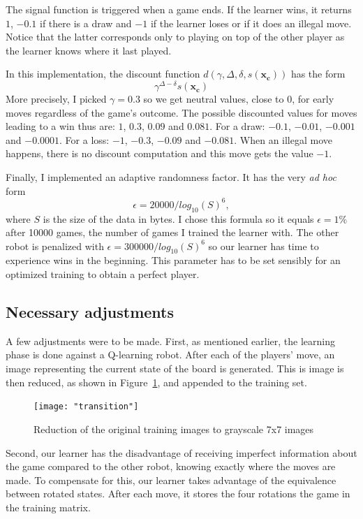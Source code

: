 \documentclass[scrartcl, 10.5 pt, conference]{ieeeconf}
\newcommand{\B}[1]{\mathbf{#1}}
\begin{document}
The signal function is triggered when a game ends. If the learner wins, it returns $1$, $-0.1$ if there is a draw and $-1$ if the learner loses or if it does an illegal move. Notice that the latter corresponds only to playing on top of the other player as the learner knows where it last played.

In this implementation, the discount function $d(\gamma, \Delta, \delta, s(\B{x_c}))$ has the form
$$\gamma^{\Delta-\delta}s(\B{x_c})$$
More precisely, I picked $\gamma=0.3$ so we get neutral values, close to $0$, for early moves regardless of the game's outcome. The possible discounted values for moves leading to a win thus are: $1$, $0.3$, $0.09$ and $0.081$. For a draw: $-0.1$, $-0.01$, $-0.001$ and $-0.0001$. For a loss: $-1$, $-0.3$, $-0.09$ and $-0.081$. When an illegal move happens, there is no discount computation and this move gets the value $-1$.

Finally, I implemented an adaptive randomness factor. It has the very \textit{ad hoc} form 
$$\epsilon = 20000/log_{10}(S)^6,$$
where $S$ is the size of the data in bytes. I chose this formula so it equals $\epsilon = 1\%$ after 10000 games, the number of games I trained the learner with. The other robot is penalized with $\epsilon = 300000/log_{10}(S)^6$ so our learner has time to experience wins in the beginning. This parameter has to be set sensibly for an optimized training to obtain a perfect player. 

\subsection{Necessary adjustments}

A few adjustments were to be made. First, as mentioned earlier, the learning phase is done against a Q-learning robot. After each of the players' move, an image representing the current state of the board is generated. This is image is then reduced, as shown in Figure~\ref{fig:transition}, and appended to the training set.

\begin{figure}
\begin{center}
\texttt{[image: "transition"]}
\caption{Reduction of the original training images to grayscale 7x7 images}
\label{fig:transition}
\end{center}
\end{figure}

Second, our learner has the disadvantage of receiving imperfect information about the game compared to the other robot, knowing exactly where the moves are made. To compensate for this, our learner takes advantage of the equivalence between rotated states. After each move, it stores the four rotations the game in the training matrix.
\end{document}
